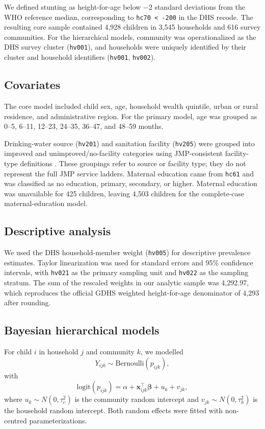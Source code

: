 \documentclass[11pt]{article}
\begin{document}
We defined stunting as height-for-age below $-2$ standard deviations from the WHO reference median, corresponding to \texttt{hc70 < -200} in the DHS recode. The resulting core sample contained 4,928 children in 3,545 households and 616 survey communities. For the hierarchical models, community was operationalized as the DHS survey cluster (\texttt{hv001}), and households were uniquely identified by their cluster and household identifiers (\texttt{hv001}, \texttt{hv002}).

\subsection{Covariates}

The core model included child sex, age, household wealth quintile, urban or rural residence, and administrative region. For the primary model, age was grouped as 0--5, 6--11, 12--23, 24--35, 36--47, and 48--59 months.

Drinking-water source (\texttt{hv201}) and sanitation facility (\texttt{hv205}) were grouped into improved and unimproved/no-facility categories using JMP-consistent facility-type definitions \citep{WHOUNICEFJMP2021}. These groupings refer to source or facility type; they do not represent the full JMP service ladders. Maternal education came from \texttt{hc61} and was classified as no education, primary, secondary, or higher. Maternal education was unavailable for 425 children, leaving 4,503 children for the complete-case maternal-education model.

\subsection{Descriptive analysis}

We used the DHS household-member weight (\texttt{hv005}) for descriptive prevalence estimates. Taylor linearization was used for standard errors and 95\% confidence intervals, with \texttt{hv021} as the primary sampling unit and \texttt{hv022} as the sampling stratum. The sum of the rescaled weights in our analytic sample was 4,292.97, which reproduces the official GDHS weighted height-for-age denominator of 4,293 after rounding.

\subsection{Bayesian hierarchical models}

For child $i$ in household $j$ and community $k$, we modelled
\[
Y_{ijk}\sim\text{Bernoulli}(p_{ijk}),
\]
with
\[
\text{logit}(p_{ijk})
=
\alpha+\mathbf{x}_{ijk}^{\top}\boldsymbol{\beta}+u_k+v_{jk},
\]
where $u_k\sim N(0,\tau_c^2)$ is the community random intercept and $v_{jk}\sim N(0,\tau_h^2)$ is the household random intercept. Both random effects were fitted with non-centred parameterizations.
\end{document}

